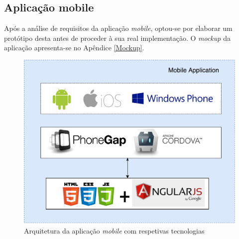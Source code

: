 

















\subsection{Aplicação mobile}


Após a análise de requisitos da aplicação \textit{mobile}, optou-se por elaborar um protótipo desta antes de proceder à sua real implementação. O \textit{mockup} da aplicação apresenta-se no Apêndice \ref{Mockup}. 

\begin{figure}[h]
	\centering
	\includegraphics[scale = 0.5]{esquemas/arquitetura-mobile.pdf}
	\caption{Arquitetura da aplicação \textit{mobile} com respetivas tecnologias}
	\label{arquiteturamobile}
\end{figure}


